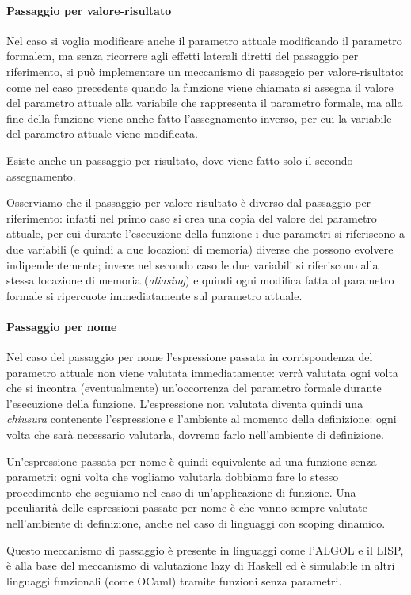 \paragraph{Passaggio per valore-risultato} Nel caso si voglia modificare anche il parametro attuale modificando il parametro formalem, ma senza ricorrere agli effetti laterali diretti del passaggio per riferimento, si può implementare un meccanismo di passaggio per valore-risultato: come nel caso precedente quando la funzione viene chiamata si assegna il valore del parametro attuale alla variabile che rappresenta il parametro formale, ma alla fine della funzione viene anche fatto l'assegnamento inverso, per cui la variabile del parametro attuale viene modificata.

Esiste anche un passaggio per risultato, dove viene fatto solo il secondo assegnamento.

Osserviamo che il passaggio per valore-risultato è diverso dal passaggio per riferimento: infatti nel primo caso si crea una copia del valore del parametro attuale, per cui durante l'esecuzione della funzione i due parametri si riferiscono a due variabili (e quindi a due locazioni di memoria) diverse che possono evolvere indipendentemente; invece nel secondo caso le due variabili si riferiscono alla stessa locazione di memoria (\emph{aliasing}) e quindi ogni modifica fatta al parametro formale si ripercuote immediatamente sul parametro attuale.

\paragraph{Passaggio per nome} Nel caso del passaggio per nome l'espressione passata in corrispondenza del parametro attuale non viene valutata immediatamente: verrà valutata ogni volta che si incontra (eventualmente) un'occorrenza del parametro formale durante l'esecuzione della funzione. L'espressione non valutata diventa quindi una \emph{chiusura} contenente l'espressione e l'ambiente al momento della definizione: ogni volta che sarà necessario valutarla, dovremo farlo nell'ambiente di definizione.

Un'espressione passata per nome è quindi equivalente ad una funzione senza parametri: ogni volta che vogliamo valutarla dobbiamo fare lo stesso procedimento che seguiamo nel caso di un'applicazione di funzione. Una peculiarità delle espressioni passate per nome è che vanno sempre valutate nell'ambiente di definizione, anche nel caso di linguaggi con scoping dinamico.

Questo meccanismo di passaggio è presente in linguaggi come l'ALGOL e il LISP, è alla base del meccanismo di valutazione lazy di Haskell ed è simulabile in altri linguaggi funzionali (come OCaml) tramite funzioni senza parametri.